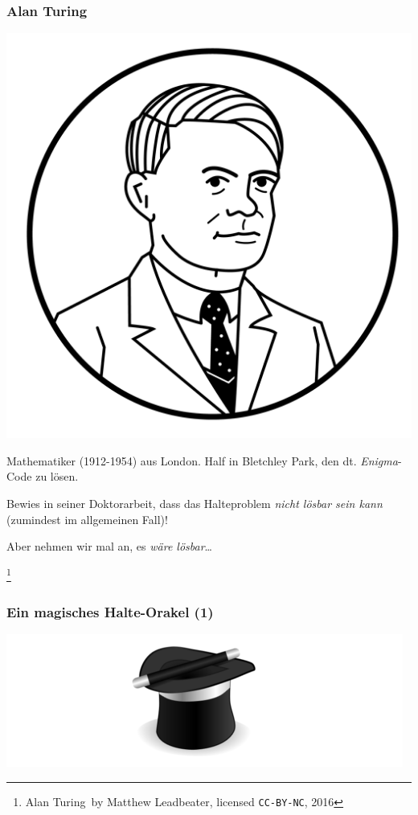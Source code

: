 \documentclass[aspectratio=43]{beamer}
\newcommand\blfootnote[1]{%
  \begingroup
  \renewcommand\thefootnote{}\footnote{#1}%
  \addtocounter{footnote}{-1}%
  \endgroup
}
\begin{document}
\begin{frame}
\frametitle{Alan Turing}

\begin{multicols}{2}

\includegraphics[scale=0.3]{images/turing-circle.png} 

\columnbreak

Mathematiker (1912-1954) aus London. Half in Bletchley Park, den dt. \emph{Enigma}-Code zu lösen.
\bigskip

Bewies in seiner Doktorarbeit, dass das Halteproblem \emph{nicht lösbar sein kann} (zumindest im allgemeinen Fall)!
\pause\bigskip

Aber nehmen wir mal an, es \emph{wäre lösbar}\dots

\end{multicols}

\blfootnote{\glqq Alan Turing\grqq\ by Matthew Leadbeater, licensed \texttt{CC-BY-NC}, 2016}
\end{frame}


\begin{frame}
\frametitle{Ein magisches Halte-Orakel (1)}
\begin{center}
\includegraphics[scale=1.4]{images/hat_alone.png} 
\end{center}
\end{frame}
\end{document}

